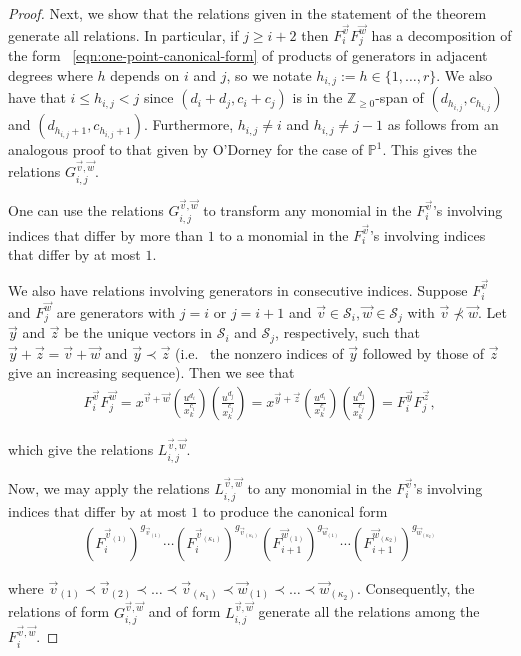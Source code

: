 \documentclass{amsart}
\theoremstyle{plain}
\theoremstyle{definition}
\theoremstyle{remark}
\numberwithin{equation}{subsection}
\newcommand\bp{{\mathbb P}}
\newcommand\bz{{\mathbb Z}}
\newcommand\mss{\mathscr{S}}
\begin{document}
\begin{proof}
Next, we show that the relations given in the statement of the theorem generate all relations. 
In particular, if $j \geq i + 2$ then $F_i^{\vec{v}} F_j^{\vec{w}}$
has a decomposition of the form ~\eqref{eqn:one-point-canonical-form} of 
products of generators in adjacent degrees where $h$
depends on $i$ and $ j$, so we notate $h_{i, j} := h \in \{1, \ldots, r\}$. We 
also have that $i \leq h_{i, j} < j$ since $(d_i + d_j, c_i + c_j)$ is in the
$\bz_{\geq 0}$-span of $(d_{h_{i, j}}, c_{h_{i, j}})$ and
$(d_{h_{i, j} + 1}, c_{h_{i, j} + 1})$. Furthermore,
$h_{i, j} \neq i$ and $h_{i, j} \neq j - 1$
as follows from an analogous proof to that given by O'Dorney
\cite[Theorem 6]{dorney:canonical} for the case of
$\bp^1$. This gives the relations
$G_{i, j}^{\vec{v}, \vec{w}}$.

One can use the relations $G_{i, j}^{\vec{v}, \vec{w}}$
to transform any monomial in the $F_i^{\vec{v}}$'s involving
indices that differ by more than $1$ to a monomial in the $F_i
^{\vec{v}}$'s involving indices that differ by at most $1$.

We also have relations involving generators in consecutive
indices. Suppose $F_i^{\vec{v}}$ and $F_j^{\vec{w}}$ are
generators with $j = i$ or $j = i + 1$ and $\vec{v} \in
\mss_i, \vec{w} \in \mss_j$ with $\vec{v} \not\prec \vec{w}$.
Let $\vec{y}$ and $\vec{z}$ be the unique vectors in $\mss_i$ and
$\mss_j$, respectively, such that $\vec{y} + \vec{z} = \vec{v} +
\vec{w}$ and $\vec{y} \prec \vec{z}$ (i.e.~ the nonzero indices
of $\vec{y}$ followed by those of $\vec{z}$ give an increasing
sequence). Then we see that
\begin{align*}
	F_i^{\vec{v}} F_j^{\vec{w}} = x^{\vec{v} + \vec{w}}
	\left(\frac{u^{d_i}}{x_k^{c_i}}\right)
	\left(\frac{u^{d_j}}{x_k^{c_j}}\right)
	= x^{\vec{y} + \vec{z}}
	\left(\frac{u^{d_i}}{x_k^{c_i}}\right)
	\left(\frac{u^{d_j}}{x_k^{c_j}}\right)
	= F_i^{\vec{y}} F_j^{\vec{z}},
\end{align*}

\noindent 
which give the relations $L_{i, j}^{\vec{v}, \vec{w}}$.

Now, we may apply the relations $L_{i, j}^{\vec{v}, \vec{w}}$
to any monomial in the $F_i^{\vec{v}}$'s involving
indices that differ by at most $1$ to produce the canonical form
\begin{align*}
	(F_i^{\vec{v}_{(1)}})^{g_{\vec{v}_{(1)}}} \cdots
	(F_i^{\vec{v}_{(\kappa_1)}})^{g_{\vec{v}_{(\kappa_1)}}}
	(F_{i + 1}^{\vec{w}_{(1)}})^{g_{\vec{w}_{(1)}}} \cdots
	(F_{i + 1}^{\vec{w}_{(\kappa_2)}})^{g_{\vec{w}_{(\kappa_2)}}}
\end{align*}

\noindent
where $\vec{v}_{(1)} \prec \vec{v}_{(2)} \prec \ldots \prec
\vec{v}_{(\kappa_1)} \prec \vec{w}_{(1)} \prec \ldots \prec
\vec{w}_{(\kappa_2)}$. Consequently, the relations of form
$G_{i, j}^{\vec{v}, \vec{w}}$ and of form $L_{i, j}^{\vec{v},
\vec{w}}$ generate all the relations among the $F_{i}^{\vec{v},
\vec{w}}$.
\end{proof}
\end{document}
